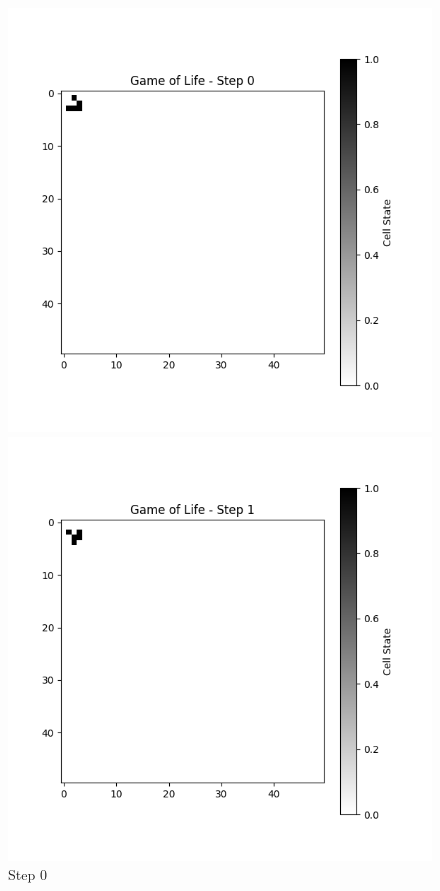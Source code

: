 \documentclass[10pt,letterpaper, onecolumn]{report}
\begin{document}
\begin{flushleft}
\begin{flushleft}
                    \begin{figure}[htbp!] %
                        \centering
                        \begin{minipage}{0.3\textwidth}
                            \centering
                            \includegraphics[width=\textwidth]{../game_of_life_step_Game of Life - Step 0}
                            \caption{Step 0}
                        \end{minipage}%
                        \begin{minipage}{0.3\textwidth}
                            \centering
                            \includegraphics[width=\textwidth]{../game_of_life_step_Game of Life - Step 1}

\end{minipage}
\end{figure}
\end{flushleft}
\end{flushleft}
\end{document}
